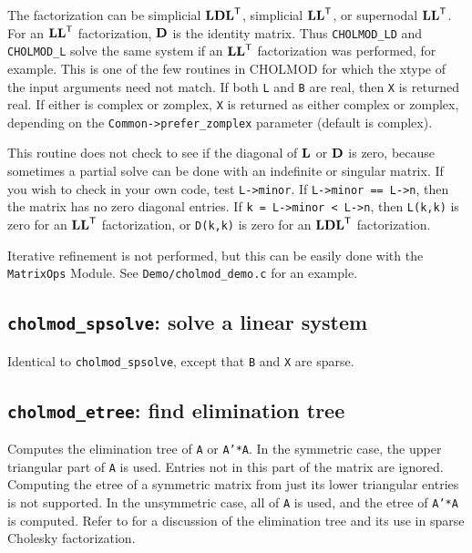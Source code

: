 \documentclass[11pt]{article}
\newcommand{\m}[1]{{\bf{#1}}}       %
\newcommand{\tr}{^{\sf T}}          %
\begin{document}
The factorization can be simplicial $\m{LDL}\tr$, simplicial $\m{LL}\tr$, or supernodal $\m{LL}\tr$.
For an $\m{LL}\tr$ factorization, $\m{D}$ is the identity matrix.  Thus {\tt CHOLMOD\_LD} and
{\tt CHOLMOD\_L} solve the same system if an $\m{LL}\tr$ factorization was performed,
for example.
This is one of the few routines in CHOLMOD for which the xtype of the input
arguments need not match.
If both {\tt L} and {\tt B} are real, then {\tt X} is returned real.  If either is complex
or zomplex, {\tt X} is returned as either complex or zomplex, depending on the
{\tt Common->prefer\_zomplex} parameter (default is complex).

This routine does not check to see if the diagonal of $\m{L}$ or $\m{D}$ is zero,
because sometimes a partial solve can be done with an indefinite or singular
matrix.  If you wish to check in your own code, test {\tt L->minor}.  If
{\tt L->minor == L->n}, then the matrix has no zero diagonal entries.
If {\tt k = L->minor < L->n}, then {\tt L(k,k)} is zero for an $\m{LL}\tr$ factorization, or
{\tt D(k,k)} is zero for an $\m{LDL}\tr$ factorization.

Iterative refinement is not performed, but this can be easily done with
the {\tt MatrixOps} Module.  See {\tt Demo/cholmod\_demo.c} for an example.

\subsection{{\tt cholmod\_spsolve}: solve a linear system}


Identical to {\tt cholmod\_spsolve}, except that {\tt B} and {\tt X} are sparse.

\newpage \subsection{{\tt cholmod\_etree}: find elimination tree}


Computes the elimination tree of {\tt A} or {\tt A'*A}.
In the symmetric case, the upper triangular part of {\tt A} is used.  Entries not
in this part of the matrix are ignored.  Computing the etree of a symmetric
matrix from just its lower triangular entries is not supported.
In the unsymmetric case, all of {\tt A} is used, and the etree of {\tt A'*A} is computed.
Refer to \cite{Liu90a} for a discussion of the elimination tree
and its use in sparse Cholesky factorization.
\end{document}
